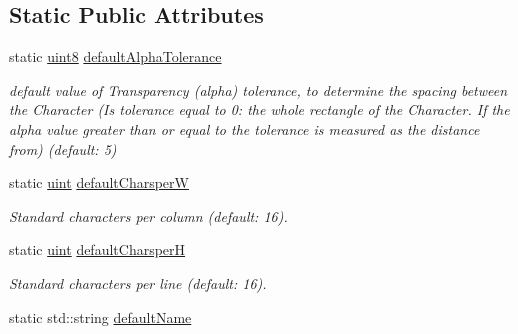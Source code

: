 \subsection*{Static Public Attributes}
\begin{DoxyCompactItemize}
\item 
\hypertarget{class_f2_c_1_1_t_t_f_font_aaf94800eb2ad8de63b2105e5424dd6c2}{
static \hyperlink{namespace_f2_c_a711deb33697d145669b9c0c4fe87c7ca}{uint8} \hyperlink{class_f2_c_1_1_t_t_f_font_aaf94800eb2ad8de63b2105e5424dd6c2}{defaultAlphaTolerance}}
\label{class_f2_c_1_1_t_t_f_font_aaf94800eb2ad8de63b2105e5424dd6c2}

\begin{DoxyCompactList}\small\item\em default value of Transparency (alpha) tolerance, to determine the spacing between the Character (Is tolerance equal to 0: the whole rectangle of the Character. If the alpha value greater than or equal to the tolerance is measured as the distance from) (default: 5) \item\end{DoxyCompactList}\item 
\hypertarget{class_f2_c_1_1_t_t_f_font_afd75a577433ed3f08eafabe9c49718a0}{
static \hyperlink{namespace_f2_c_a58be2bac9eb3e3c99cb41b6008bf4fae}{uint} \hyperlink{class_f2_c_1_1_t_t_f_font_afd75a577433ed3f08eafabe9c49718a0}{defaultCharsperW}}
\label{class_f2_c_1_1_t_t_f_font_afd75a577433ed3f08eafabe9c49718a0}

\begin{DoxyCompactList}\small\item\em Standard characters per column (default: 16). \item\end{DoxyCompactList}\item 
\hypertarget{class_f2_c_1_1_t_t_f_font_a14b235548ed14123b78d4436956d9639}{
static \hyperlink{namespace_f2_c_a58be2bac9eb3e3c99cb41b6008bf4fae}{uint} \hyperlink{class_f2_c_1_1_t_t_f_font_a14b235548ed14123b78d4436956d9639}{defaultCharsperH}}
\label{class_f2_c_1_1_t_t_f_font_a14b235548ed14123b78d4436956d9639}

\begin{DoxyCompactList}\small\item\em Standard characters per line (default: 16). \item\end{DoxyCompactList}\item 
\hypertarget{class_f2_c_1_1_t_t_f_font_a75376c53471c0950edf5fe4389efa223}{
static std::string \hyperlink{class_f2_c_1_1_t_t_f_font_a75376c53471c0950edf5fe4389efa223}{defaultName}}
\label{class_f2_c_1_1_t_t_f_font_a75376c53471c0950edf5fe4389efa223}


\end{DoxyCompactItemize}

